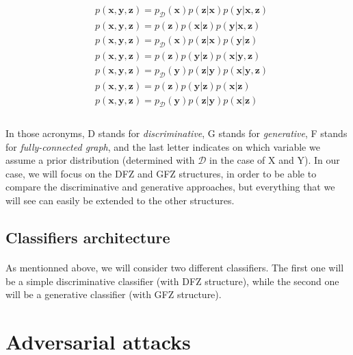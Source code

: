 \documentclass[11pt,twocolumn,letterpaper]{article}
\begin{document}
\begin{align*}
 & p(\bm{x}, \bm{y}, \bm{z}) = p_{\mathcal{D}}(\bm{x})p(\bm{z}|\bm{x})p(\bm{y}|\bm{x}, \bm{z}) \tag{DFX} \\
 & p(\bm{x}, \bm{y}, \bm{z}) = p(\bm{z})p(\bm{x}|\bm{z})p(\bm{y}|\bm{x}, \bm{z}) \tag{DFZ} \\
 & p(\bm{x}, \bm{y}, \bm{z}) = p_{\mathcal{D}}(\bm{x})p(\bm{z}|\bm{x})p(\bm{y}|\bm{z}) \tag{DBX} \\
 & p(\bm{x}, \bm{y}, \bm{z}) = p(\bm{z})p(\bm{y}|\bm{z})p(\bm{x}|\bm{y}, \bm{z}) \tag{GFZ} \\
 & p(\bm{x}, \bm{y}, \bm{z}) = p_{\mathcal{D}}(\bm{y})p(\bm{z}|\bm{y})p(\bm{x}|\bm{y}, \bm{z}) \tag{GFY} \\
 & p(\bm{x}, \bm{y}, \bm{z}) = p(\bm{z})p(\bm{y}|\bm{z})p(\bm{x}|\bm{z}) \tag{GBZ} \\
 & p(\bm{x}, \bm{y}, \bm{z}) = p_{\mathcal{D}}(\bm{y})p(\bm{z}|\bm{y})p(\bm{x}|\bm{z}) \tag{GBY} \\
\end{align*}

\paragraph{} In those acronyms, D stands for \textit{discriminative}, G stands for \textit{generative}, F stands for \textit{fully-connected graph}, and the last letter indicates on which variable we assume a prior distribution (determined with $\mathcal{D}$ in the case of X and Y). In our case, we will focus on the DFZ and GFZ structures, in order to be able to compare the discriminative and generative approaches, but everything that we will see can easily be extended to the other structures.

\subsection{Classifiers architecture}

\paragraph{} As mentionned above, we will consider two different classifiers. The first one will be a simple discriminative classifier (with DFZ structure), while the second one will be a generative classifier (with GFZ structure).

\section{Adversarial attacks}
\label{sec:attacks}
\end{document}
